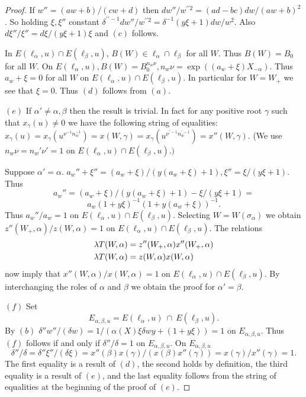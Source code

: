 \documentclass{memo-l}
\theoremstyle{definition}
\theoremstyle{remark}
\numberwithin{section}{chapter}
\numberwithin{equation}{chapter}
\begin{document}
\begin{proof}
   If $w'' = (aw+b)/(cw+d)$ then $dw''/w^{\prime\prime2} = (ad-bc)dw/(aw+b)^{2}$.  So
holding ${\xi},{\xi}''$ constant ${\delta}^{\prime\prime-1}dw''/w^{\prime\prime2} =
{\delta}^{-1}(y{\xi}+1)dw/w^{2}$.  Also $d{\xi}''/{\xi}'' =
d{\xi}/(y{\xi}+1){\xi}$ and $(c)$ follows.

\smallskip
   In $E({\ell}_{{\alpha}},u) \cap E({\ell}_{{\beta}},u)$, $B(W)  \in
{\ell}_{{\alpha}} \cap {\ell}_{{\beta}}$ for all $W$.  Thus $B(W) =
B_{0}$ for all $W$.  On $E({\ell}_{{\alpha}},u), B(W) =
B_{0}^{n_w{\nu}}, n_{w}{\nu} = \exp((a_{w}+{\xi})X_{-{\alpha}})$.  Thus
$a_{w} + {\xi} = 0$ for all $W$ on $E({\ell}_{{\alpha}},u) \cap
E({\ell}_{{\beta}},u)$.  In particular for $W = W_{+}$ we see that ${\xi} =
0$.  Thus $(d)$ follows from $(a)$.

\smallskip
   $(e)$ If ${\alpha}' \ne {\alpha}, {\beta}$ then the result is trivial.
In fact for any positive root ${\gamma}$ such that $x_{{\gamma}}(u) \ne 0$
we have the following string of equalities: $x_{{\gamma}}(u) =
x_{{\gamma}}(u^{\nu^{-1}n_{w}^{-1}}) = x(W,{\gamma}) =
x_{{\gamma}}(u^{\nu^{\prime-1}n_{w}^{\prime-1}}) = x''(W,{\gamma})$.  (We use
$n_{w}{\nu} = n_{w}'{\nu}' = 1$ on $E({\ell}_{{\alpha}},u) \cap
E({\ell}_{{\beta}},u).)$

   Suppose ${\alpha}' = {\alpha}$.  $a_{w}''+{\xi}'' =
(a_{w}+{\xi})/(y(a_{w}+{\xi})+1), {\xi''} = {\xi}/(y{\xi}+1)$.  Thus
$$
a_{w}'' = (a_{w}+{\xi})/(y(a_{w}+{\xi})+1) - {\xi}/(y{\xi}+1) =
$$
$$
a_{w}(1+y{\xi})^{-1}(1+y(a_{w}+{\xi}))^{-1}.
$$
Thus $a_{w}''/a_{w} = 1$ on $E({\ell}_{{\alpha}},u) \cap
E({\ell}_{{\beta}},u)$.  Selecting $W = W({\sigma}_{{\alpha}})$ we obtain
$z''(W_{+},{\alpha})/z(W,{\alpha}) = 1$ on $E({\ell}_{{\alpha}},u) \cap
E({\ell}_{{\beta}},u)$.  The relations
$$
\aligned
{\lambda}T(W,{\alpha}) &= z''(W_{+},{\alpha})x''(W_{+},{\alpha}) \\
{\lambda}T(W,{\alpha}) &= z(W,{\alpha})x(W,{\alpha})
\endaligned
$$
now imply that $x''(W,{\alpha})/x(W,{\alpha}) = 1$ on $E({\ell}_{{\alpha}},u)
\cap E({\ell}_{{\beta}},u)$.  By interchanging the roles of ${\alpha}$
and ${\beta}$ we obtain the proof for ${\alpha}' = {\beta}$.

\smallskip
   $(f)$ Set $$E_{\alpha,\beta,u} = E(\ell_\alpha,u)\ \cap\
   E(\ell_\beta,u).$$  By $(b)$ ${\delta}''w''/({\delta}w) =
1/({\alpha}(X){\xi}{\delta}wy+(1+y{\xi})) = 1$ on $E_{\alpha,\beta,u}$.  Thus $(f)$ follows if and only if
${\delta}''/{\delta} = 1$ on $E_{\alpha,\beta,u}$.  On
$E_{\alpha,\beta,u}$
$$
{\delta}''/{\delta} = {\delta}''{\xi}''/({\delta}{\xi}) =
x''({\beta})x({\gamma})/(x({\beta})x''({\gamma})) = x({\gamma})/x''({\gamma}) =
1.
$$
The first equality is a result of $(d)$, the second holds by definition,
the third equality is a result of $(e)$, and the last equality follows from
the string of equalities at the beginning of the proof of $(e)$.
\end{proof}
\end{document}
